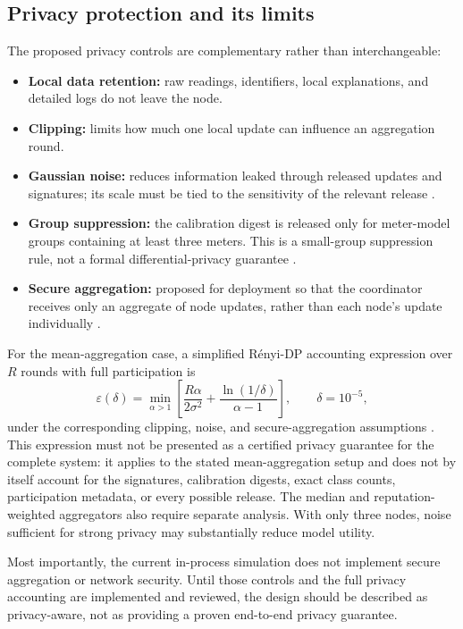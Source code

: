 \subsection{Privacy protection and its limits}
The proposed privacy controls are complementary rather than interchangeable:
\begin{itemize}
  \item \textbf{Local data retention:} raw readings, identifiers, local explanations, and detailed logs do not leave the node.
  \item \textbf{Clipping:} limits how much one local update can influence an aggregation round.
  \item \textbf{Gaussian noise:} reduces information leaked through released updates and signatures; its scale must be tied to the sensitivity of the relevant release \cite{dwork2014,abadi2016}.
  \item \textbf{Group suppression:} the calibration digest is released only for meter-model groups containing at least three meters. This is a small-group suppression rule, not a formal differential-privacy guarantee \cite{sweeney2002}.
  \item \textbf{Secure aggregation:} proposed for deployment so that the coordinator receives only an aggregate of node updates, rather than each node's update individually \cite{bonawitz2017}.
\end{itemize}

For the mean-aggregation case, a simplified Rényi-DP accounting expression over $R$ rounds with full participation is
\begin{equation}
 \varepsilon(\delta)=\min_{\alpha>1}\left[
 \frac{R\alpha}{2\sigma^2}+\frac{\ln(1/\delta)}{\alpha-1}
 \right],
 \qquad \delta=10^{-5},
 \label{eq:goal4-dp-accounting}
\end{equation}
under the corresponding clipping, noise, and secure-aggregation assumptions \cite{mironov2017}. This expression must not be presented as a certified privacy guarantee for the complete system: it applies to the stated mean-aggregation setup and does not by itself account for the signatures, calibration digests, exact class counts, participation metadata, or every possible release. The median and reputation-weighted aggregators also require separate analysis. With only three nodes, noise sufficient for strong privacy may substantially reduce model utility.

Most importantly, the current in-process simulation does not implement secure aggregation or network security. Until those controls and the full privacy accounting are implemented and reviewed, the design should be described as privacy-aware, not as providing a proven end-to-end privacy guarantee.

